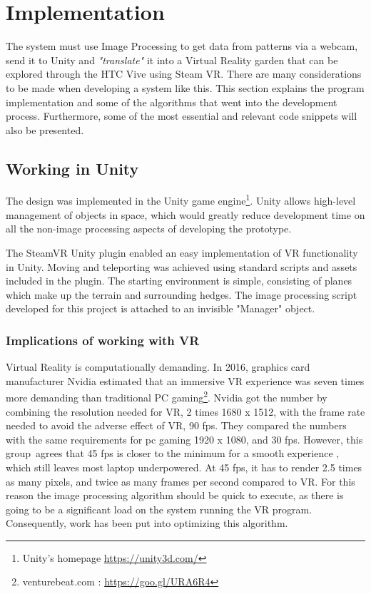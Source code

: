 \chapter{Implementation}
	The system must use Image Processing to get data from patterns via a webcam, send it to Unity and \textit{"translate"} it into a Virtual Reality garden that can be explored through the HTC Vive using Steam VR. There are many considerations to be made when developing a system like this. This section explains the program implementation and some of the algorithms that went into the development process. Furthermore, some of the most essential and relevant code snippets will also be presented.
	
	\section{Working in Unity}
The design was implemented in the Unity game engine\footnote{Unity's homepage \url{https://unity3d.com/}}. Unity allows high-level management of objects in space, which would greatly reduce development time on all the non-image processing aspects of developing the prototype.

The SteamVR Unity plugin enabled an easy implementation of VR functionality in Unity. Moving and teleporting was achieved using standard scripts and assets included in the plugin. 	
The starting environment is simple, consisting of planes which make up the terrain and surrounding hedges. The image processing script developed for this project is attached to an invisible "Manager" object.
	\subsection{Implications of working with VR}

	Virtual Reality is computationally demanding. In 2016, graphics card manufacturer Nvidia estimated that an immersive VR experience was seven times more demanding than traditional PC gaming\footnote{venturebeat.com : \url{https://goo.gl/URA6R4}}. Nvidia got the number by combining the resolution needed for VR, 2 times 1680 x 1512, with the frame rate needed to avoid the adverse effect of VR, 90 fps. They compared the numbers with the same requirements for pc gaming 1920 x 1080, and 30 fps. However, this group agrees that 45 fps is closer to the minimum for a smooth experience , which still leaves most laptop  underpowered. At 45 fps, it has to render 2.5 times as many pixels, and twice as many frames per second compared to VR.
	For this reason the image processing algorithm should be quick to execute, as there is going to be a significant load on the system running the VR program. Consequently, work has been put into optimizing this algorithm.
